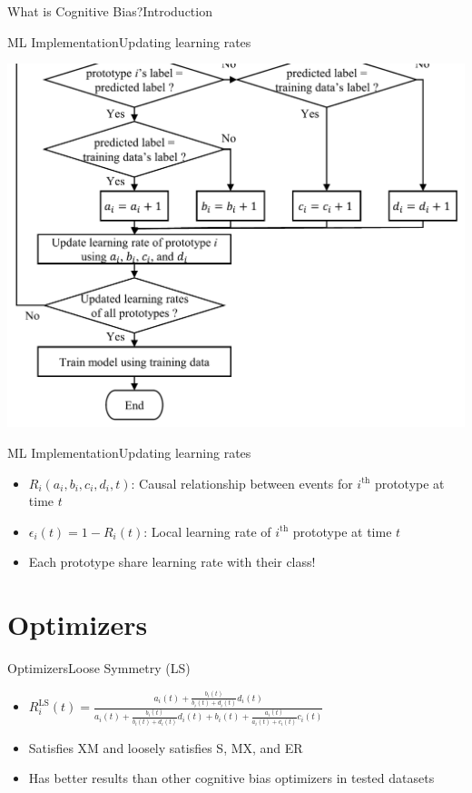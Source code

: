 \documentclass[
	aspectratio=169,	%
	onlytextwidth,		%
	t,					%
	]{beamer}
\begin{document}
\begin{frame}[fragile]{What is Cognitive Bias?}{Introduction}
	\begin{frame}[fragile]{ML Implementation}{Updating learning rates}
	
		\centering
				\includegraphics[width=.4\textwidth]{myfigs/lr flowchart2.png}
	\end{frame}

	\begin{frame}{ML Implementation}{Updating learning rates}
		\vfill
		\begin{itemize}
			\item<1->$R_{i}(a_{i},b_{i},c_{i},d_{i},t)$: Causal relationship between events for $i^{\text{th}}$ prototype at time $t$
			\item<2->$\epsilon_{i}(t) = 1- R_{i}(t)$: Local learning rate of $i^{\text{th}}$ prototype at time $t$
			\item <3-> Each prototype share learning rate with their class!
		\end{itemize}
		\vfill

	\end{frame}


	\section{Optimizers}
	
	\begin{frame}[fragile]{Optimizers}{Loose Symmetry (LS)}

		\begin{itemize}
			
		\item<1-> $R^{\text{LS}}_{i}(t) = \frac{a_{i}(t) 
		+ \frac{b_{i}(t)}{b_{i}(t) + d_{i}(t)}d_{i}(t)}
		{a_{i}(t) 
		+ \frac{b_{i}(t)}{b_{i}(t) + d_{i}(t)}d_{i}(t) 
		+ b_{i}(t) 
		+ \frac{a_{i}(t)}{a_{i}(t) + c_{i}(t)}c_{i}(t)}$~\cite{tak10, man21} 
		\vspace{10pt}
		\item<2-> Satisfies XM and loosely satisfies S, MX, and ER~\cite{tak10} 
		\item <3-> Has better results than other cognitive bias optimizers in tested datasets~\cite{tak10} 
		\end{itemize}
	\end{frame}


\end{frame}
\end{document}
